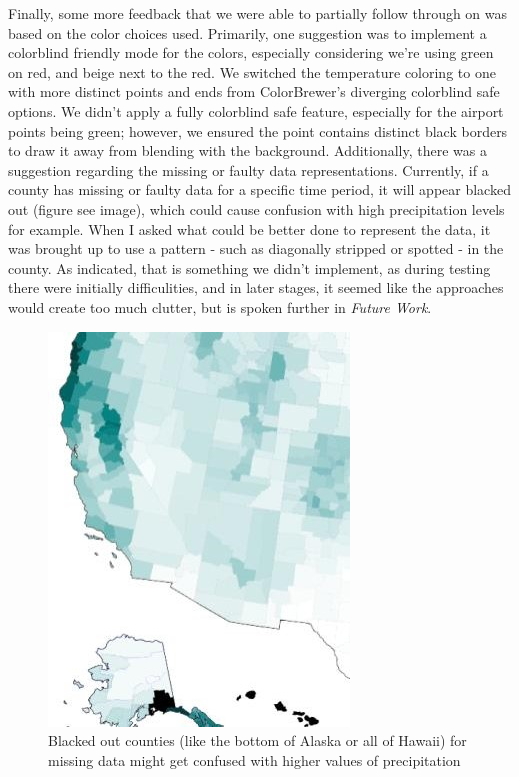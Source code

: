 \documentclass[10pt,twocolumn,twoside]{opticajnl}
\begin{document}
Finally, some more feedback that we were able to partially follow through on was based on the color choices used. Primarily, one suggestion was to implement a colorblind friendly mode for the colors, especially considering we're using green on red, and beige next to the red. We switched the temperature coloring to one with more distinct points and ends from ColorBrewer's \cite{colorbrewer} diverging colorblind safe options. We didn't apply a fully colorblind safe feature, especially for the airport points being green; however, we ensured the point contains distinct black borders to draw it away from blending with the background. Additionally, there was a suggestion regarding the missing or faulty data representations. Currently, if a county has missing or faulty data for a specific time period, it will appear blacked out (figure see image), which could cause confusion with high precipitation levels for example. When I asked what could be better done to represent the data, it was brought up to use a pattern - such as diagonally stripped or spotted - in the county. As indicated, that is something we didn't implement, as during testing there were initially difficulities, and in later stages, it seemed like the approaches would create too much clutter, but is spoken further in \textit{Future Work}.


\begin{figure}
	\centering
	\includegraphics[scale=0.35]{images/countyBlacked.jpg}
	\caption{Blacked out counties (like the bottom of Alaska or all of Hawaii) for missing data might get confused with higher values of precipitation}
\end{figure}
\end{document}

